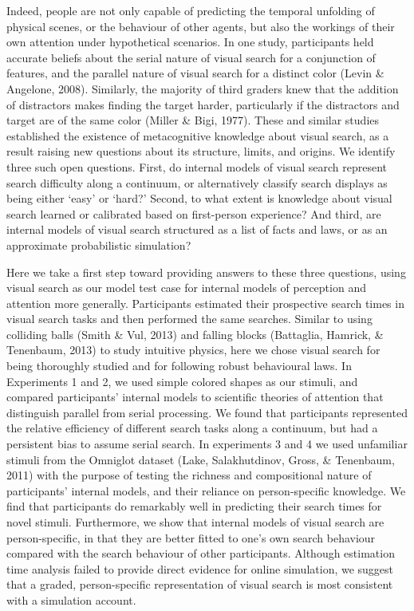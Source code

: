 \documentclass[12pt,twoside]{reedthesis}
\begin{document}
Indeed, people are not only capable of predicting the temporal unfolding of physical scenes, or the behaviour of other agents, but also the workings of their own attention under hypothetical scenarios. In one study, participants held accurate beliefs about the serial nature of visual search for a conjunction of features, and the parallel nature of visual search for a distinct color (Levin \& Angelone, 2008). Similarly, the majority of third graders knew that the addition of distractors makes finding the target harder, particularly if the distractors and target are of the same color (Miller \& Bigi, 1977). These and similar studies established the existence of metacognitive knowledge about visual search, as a result raising new questions about its structure, limits, and origins. We identify three such open questions. First, do internal models of visual search represent search difficulty along a continuum, or alternatively classify search displays as being either `easy' or `hard?' Second, to what extent is knowledge about visual search learned or calibrated based on first-person experience? And third, are internal models of visual search structured as a list of facts and laws, or as an approximate probabilistic simulation?

Here we take a first step toward providing answers to these three questions, using visual search as our model test case for internal models of perception and attention more generally. Participants estimated their prospective search times in visual search tasks and then performed the same searches. Similar to using colliding balls (Smith \& Vul, 2013) and falling blocks (Battaglia, Hamrick, \& Tenenbaum, 2013) to study intuitive physics, here we chose visual search for being thoroughly studied and for following robust behavioural laws. In Experiments 1 and 2, we used simple colored shapes as our stimuli, and compared participants' internal models to scientific theories of attention that distinguish parallel from serial processing. We found that participants represented the relative efficiency of different search tasks along a continuum, but had a persistent bias to assume serial search. In experiments 3 and 4 we used unfamiliar stimuli from the Omniglot dataset (Lake, Salakhutdinov, Gross, \& Tenenbaum, 2011) with the purpose of testing the richness and compositional nature of participants' internal models, and their reliance on person-specific knowledge. We find that participants do remarkably well in predicting their search times for novel stimuli. Furthermore, we show that internal models of visual search are person-specific, in that they are better fitted to one's own search behaviour compared with the search behaviour of other participants. Although estimation time analysis failed to provide direct evidence for online simulation, we suggest that a graded, person-specific representation of visual search is most consistent with a simulation account.
\end{document}

